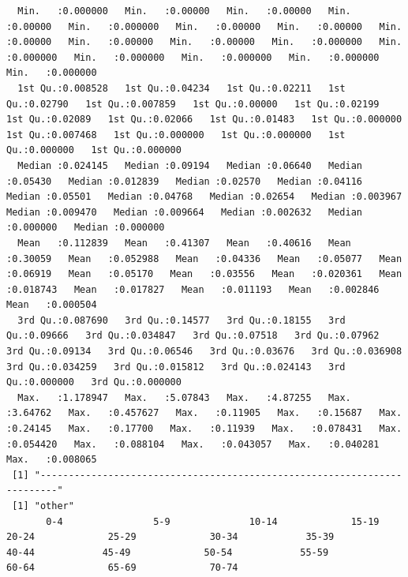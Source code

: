 \documentclass[11pt]{article}
\begin{document}
\begin{itemize}
\begin{verbatim}
  Min.   :0.000000   Min.   :0.00000   Min.   :0.00000   Min.   :0.00000   Min.   :0.000000   Min.   :0.00000   Min.   :0.00000   Min.   :0.00000   Min.   :0.00000   Min.   :0.00000   Min.   :0.000000   Min.   :0.000000   Min.   :0.000000   Min.   :0.000000   Min.   :0.000000   Min.   :0.000000  
  1st Qu.:0.008528   1st Qu.:0.04234   1st Qu.:0.02211   1st Qu.:0.02790   1st Qu.:0.007859   1st Qu.:0.00000   1st Qu.:0.02199   1st Qu.:0.02089   1st Qu.:0.02066   1st Qu.:0.01483   1st Qu.:0.000000   1st Qu.:0.007468   1st Qu.:0.000000   1st Qu.:0.000000   1st Qu.:0.000000   1st Qu.:0.000000  
  Median :0.024145   Median :0.09194   Median :0.06640   Median :0.05430   Median :0.012839   Median :0.02570   Median :0.04116   Median :0.05501   Median :0.04768   Median :0.02654   Median :0.003967   Median :0.009470   Median :0.009664   Median :0.002632   Median :0.000000   Median :0.000000  
  Mean   :0.112839   Mean   :0.41307   Mean   :0.40616   Mean   :0.30059   Mean   :0.052988   Mean   :0.04336   Mean   :0.05077   Mean   :0.06919   Mean   :0.05170   Mean   :0.03556   Mean   :0.020361   Mean   :0.018743   Mean   :0.017827   Mean   :0.011193   Mean   :0.002846   Mean   :0.000504  
  3rd Qu.:0.087690   3rd Qu.:0.14577   3rd Qu.:0.18155   3rd Qu.:0.09666   3rd Qu.:0.034847   3rd Qu.:0.07518   3rd Qu.:0.07962   3rd Qu.:0.09134   3rd Qu.:0.06546   3rd Qu.:0.03676   3rd Qu.:0.036908   3rd Qu.:0.034259   3rd Qu.:0.015812   3rd Qu.:0.024143   3rd Qu.:0.000000   3rd Qu.:0.000000  
  Max.   :1.178947   Max.   :5.07843   Max.   :4.87255   Max.   :3.64762   Max.   :0.457627   Max.   :0.11905   Max.   :0.15687   Max.   :0.24145   Max.   :0.17700   Max.   :0.11939   Max.   :0.078431   Max.   :0.054420   Max.   :0.088104   Max.   :0.043057   Max.   :0.040281   Max.   :0.008065  
 [1] "-------------------------------------------------------------------------"
 [1] "other"
       0-4                5-9              10-14             15-19              20-24             25-29             30-34            35-39            40-44            45-49             50-54            55-59             60-64             65-69             70-74


\end{verbatim}
\end{itemize}
\end{document}
